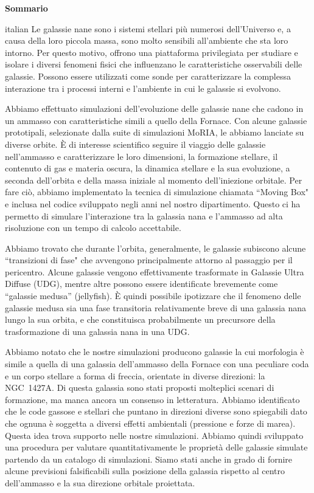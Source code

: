 \clearpage
\thispagestyle{empty}
\null%
\begin{center}
  {\Large \textbf{Sommario}}\\
\end{center}
\begin{otherlanguage*}{italian}
Le galassie nane sono i sistemi stellari più numerosi dell'Universo e, a causa della loro piccola massa, sono molto sensibili all'ambiente che sta loro intorno.
Per questo motivo, offrono una piattaforma privilegiata per studiare e isolare i diversi fenomeni fisici che influenzano le caratteristiche osservabili delle galassie.
Possono essere utilizzati come sonde per caratterizzare la complessa interazione tra i processi interni e l'ambiente in cui le galassie si evolvono.

Abbiamo effettuato simulazioni dell'evoluzione delle galassie nane che cadono in un ammasso con caratteristiche simili a quello della Fornace.
Con alcune galassie prototipali, selezionate dalla suite di simulazioni MoRIA, le abbiamo lanciate su diverse orbite.
È di interesse scientifico seguire il viaggio delle galassie nell'ammasso e caratterizzare le loro dimensioni, la formazione stellare, il contenuto di gas e materia oscura, la dinamica stellare e la sua evoluzione, a seconda dell'orbita e della massa iniziale al momento dell'iniezione orbitale.
Per fare ciò, abbiamo implementato la tecnica di simulazione chiamata ``Moving Box" e inclusa nel codice sviluppato negli anni nel nostro dipartimento.
Questo ci ha permetto di simulare l'interazione tra la galassia nana e l'ammasso ad alta risoluzione con un tempo di calcolo accettabile.

Abbiamo trovato che durante l'orbita, generalmente, le galassie subiscono alcune ``transizioni di fase" che avvengono principalmente attorno al passaggio per il pericentro.
Alcune galassie vengono effettivamente trasformate in Galassie Ultra Diffuse (UDG), mentre altre possono essere identificate brevemente come ``galassie medusa'' (jellyfish).
È quindi possibile ipotizzare che il fenomeno delle galassie medusa sia una fase transitoria relativamente breve di una galassia nana lungo la sua orbita, e che constituisca probabilmente un precursore della trasformazione di una galassia nana in una UDG.

Abbiamo notato che le nostre simulazioni producono galassie la cui morfologia è simile a quella di una galassia dell'ammasso della Fornace con una peculiare coda \Hi{} e un corpo stellare a forma di freccia, orientate in diverse direzioni: la NGC~1427A.
Di questa galassia sono stati proposti molteplici scenari di formazione, ma manca ancora un consenso in letteratura.
Abbiamo identificato che le code gassose e stellari che puntano in direzioni diverse sono spiegabili dato che ognuna è soggetta a diversi effetti ambientali (pressione e forze di marea).
Questa idea trova supporto nelle nostre simulazioni.
Abbiamo quindi sviluppato una procedura per valutare quantitativamente le proprietà delle galassie simulate partendo da un catalogo di simulazioni.
Siamo stati anche in grado di fornire alcune previsioni falsificabili sulla posizione della galassia rispetto al centro dell'ammasso e la sua direzione orbitale proiettata.


\end{otherlanguage*}

